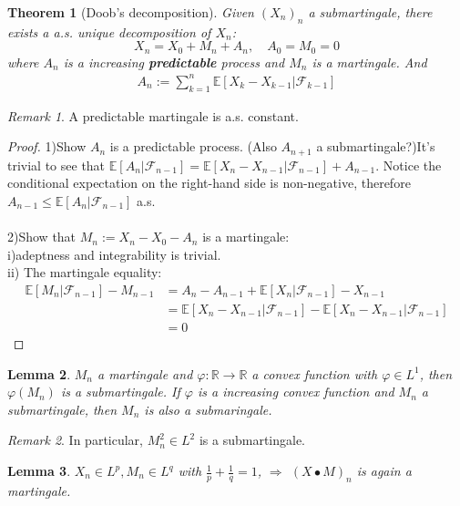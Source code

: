 \documentclass[a4paper,11pt]{book}
\newtheorem{theorem}{Theorem}[section]
\newtheorem{lemma}[theorem]{Lemma}
\theoremstyle{definition}
\theoremstyle{remark}
\newtheorem*{remark}{Remark}
\begin{document}
\begin{theorem}[Doob's decomposition]
	Given $(X_n)_n$ a submartingale, there exists a a.s. unique decomposition of $X_n$:
	\begin{equation*}
		X_n = X_0 + M_n + A_n, \quad A_0 = M_0 = 0
	\end{equation*}
	where $A_n$ is a increasing \textbf{predictable} process and $M_n$ is a martingale. And
	\begin{align*}
		A_n := \sum_{k= 1}^n \mathbb{E}[X_k - X_{k-1}|\mathcal{F}_{k-1}]
	\end{align*} 
\end{theorem}
\begin{remark}
A predictable martingale is a.s. constant.	
\end{remark}
\begin{proof}
	1)Show $A_n$ is a predictable process. (Also $A_{n+1}$ a submartingale?)It's trivial to see that $\mathbb{E}[A_n|\mathcal{F}_{n-1}] = \mathbb{E}[X_n - X_{n-1}|\mathcal{F}_{n-1}] + A_{n-1}$. Notice the conditional expectation on the right-hand side is non-negative, therefore $A_{n-1} \leq  \mathbb{E}[A_n|\mathcal{F}_{n-1}]$ a.s.\\
	\quad\\
	2)Show that $M_n:= X_n - X_0 - A_n$ is a martingale:\\
	i)adeptness and integrability is trivial.\\
	ii) The martingale equality:
	\begin{align*}
		\mathbb{E}[M_n | \mathcal{F}_{n-1}] - M_{n-1} &= A_n - A_{n-1} + \mathbb{E}[X_n| \mathcal{F}_{n-1}] - X_{n-1}\\
		&= \mathbb{E}[X_n - X_{n-1}|\mathcal{F}_{n-1}] - \mathbb{E}[X_n - X_{n-1}|\mathcal{F}_{n-1}]\\
		&= 0
	\end{align*}
\end{proof}

\begin{lemma}
	$M_n$ a martingale and $\varphi: \mathbb{R} \rightarrow \mathbb{R}$ a convex function with $\varphi \in L^1$, then $\varphi(M_n)$ is a submartingale. If $\varphi$ is a increasing convex function and $M_n$ a submartingale, then $M_n$ is also a submaringale.
\end{lemma}
\begin{remark}
In particular, $M_n^2 \in L^2$ is a submartingale.
\end{remark}




\begin{lemma}
	$X_n \in L^p, M_n \in L^q$ with $\frac{1}{p} + \frac{1}{q} = 1$, $\Rightarrow$ $(X \bullet M)_n $ is again a martingale.
\end{lemma}
\end{document}
